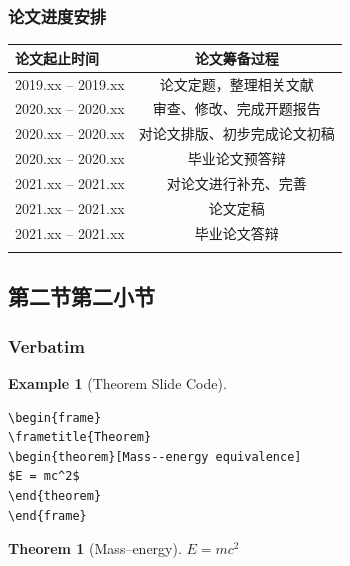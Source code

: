 \documentclass[11pt]{beamer}
\newtheorem{thm}{Theorem}
\numberwithin{thm}{section}
\numberwithin{defn}{section}
\numberwithin{lmm}{section}
\theoremstyle{example}
\newtheorem{exam}{Example}
\numberwithin{figure}{section}
\numberwithin{table}{section}
\numberwithin{equation}{section}
\begin{document}
\begin{frame}
\frametitle{论文进度安排}
\begin{table}[htp!]
\centering
\renewcommand\arraystretch{1.5} %
\begin{tabularx}{0.82\textwidth}{|P{3.2cm}|C|}
\Xhline{2\arrayrulewidth}
论文起止时间       &  论文筹备过程\\
\hline
2019.xx -- 2019.xx    &  论文定题，整理相关文献\\
\hline
2020.xx -- 2020.xx    &  审查、修改、完成开题报告\\
\hline
2020.xx -- 2020.xx   &  对论文排版、初步完成论文初稿\\
\hline
2020.xx -- 2020.xx    &  毕业论文预答辩\\
\hline
2021.xx -- 2021.xx    &  对论文进行补充、完善\\
\hline
2021.xx -- 2021.xx    &  论文定稿\\
\hline
2021.xx -- 2021.xx    &  毕业论文答辩\\
\Xhline{2\arrayrulewidth}
\end{tabularx}
\end{table}

\end{frame}

\subsection{第二节第二小节}

\begin{frame}[fragile] %
\frametitle{Verbatim}
\begin{exam}[Theorem Slide Code]
\begin{verbatim}
\begin{frame}
\frametitle{Theorem}
\begin{theorem}[Mass--energy equivalence]
$E = mc^2$
\end{theorem}
\end{frame}\end{verbatim}
\end{exam}

\begin{thm}[Mass--energy]
$E = mc^2$
\end{thm}

\end{frame}

\end{document}
